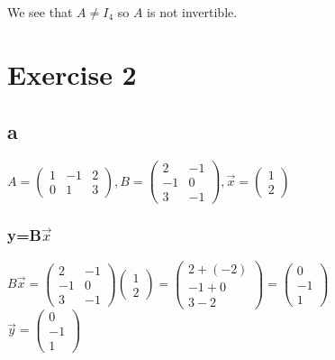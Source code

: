 \documentclass{article}
\begin{document}
We see that $A \not = I_{4}$ so $A$ is not invertible.

\newpage

\section*{Exercise 2}

\subsection*{a}

$A=
\left (
    \begin{matrix}
        1 & -1 & 2\\
        0 & 1 & 3
    \end{matrix}
\right )
,
B=
\left (
    \begin{matrix}
        2 & -1\\
        -1 & 0\\
        3 & -1
    \end{matrix}
\right )
, \vec{x} =
\left (
    \begin{matrix}
        1\\
        2
    \end{matrix}
\right )
$

\subsubsection*{y=B$\vec{x}$}
$B\vec{x} =
\left (
    \begin{matrix}
        2 & -1\\
        -1 & 0\\
        3 & -1
    \end{matrix}
\right )
\left (
    \begin{matrix}
        1\\
        2
    \end{matrix}
\right )
=
\left (
    \begin{matrix}
        2 + (-2)\\
        -1 + 0\\
        3 - 2
    \end{matrix}
\right )
=
\left (
    \begin{matrix}
        0\\
        -1\\
        1
    \end{matrix}
\right )
$\\
$\vec{y} =
\left (
    \begin{matrix}
        0\\
        -1\\
        1
    \end{matrix}
\right )
$
\end{document}
